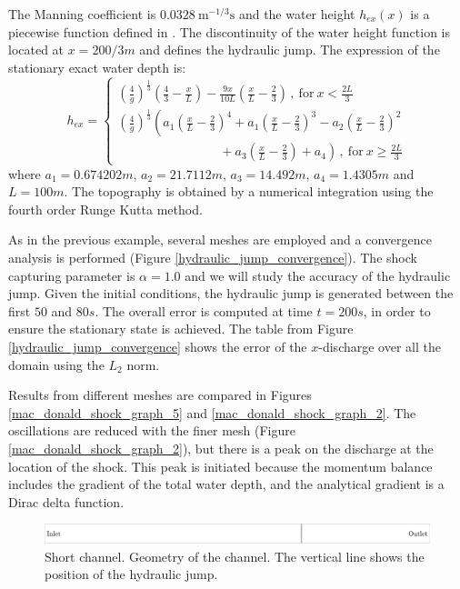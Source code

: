 The Manning coefficient is $0.0328\ \text{m}^{-1/3}\text{s}$ and the water height $h_{ex}(x)$ is a piecewise function defined in \cite{delestre2013}. The discontinuity of the water height function is located at $x=200/3m$ and defines the hydraulic jump. The expression of the stationary exact water depth is:
\begin{equation} \label{jump_height_definition}
    h_{ex} = \begin{cases}
        \left(\frac{4}{g}\right)^\frac{1}{3} \left(\frac{4}{3} - \frac{x}{L}\right) - \frac{9x}{10L}
            \left(\frac{x}{L} - \frac{2}{3}\right) \, ,\ \text{for} \ x < \frac{2L}{3}\\
        \left(\frac{4}{g}\right)^\frac{1}{3} \left(
              a_1 \left(\frac{x}{L} - \frac{2}{3}\right)^4
            + a_1 \left(\frac{x}{L} - \frac{2}{3}\right)^3
            - a_2 \left(\frac{x}{L} - \frac{2}{3}\right)^2 \right. \\ \left. \qquad\qquad\qquad\qquad
            + a_3 \left(\frac{x}{L} - \frac{2}{3}\right)
            + a_4
        \right) \, ,\ \text{for} \ x \geq \frac{2L}{3}
    \end{cases}
\end{equation}
where $a_1=0.674202m$, $a_2=21.7112m$, $a_3=14.492m$, $a_4=1.4305m$ and $L=100m$. The topography is obtained by a numerical integration using the fourth order Runge Kutta method.

As in the previous example, several meshes are employed and a convergence analysis is performed (Figure \ref{hydraulic_jump_convergence}). The shock capturing parameter is $\alpha=1.0$ and we will study the accuracy of the hydraulic jump. 
Given the initial conditions, the hydraulic jump is generated between the first $50$ and $80s$. The overall error is computed at time $t=200s$, in order to ensure the stationary state is achieved.
The table from Figure \ref{hydraulic_jump_convergence} shows the error of the $x$-discharge over all the domain using the $L_2$ norm.

Results from different meshes are compared in Figures \ref{mac_donald_shock_graph_5} and \ref{mac_donald_shock_graph_2}. The oscillations are reduced with the finer mesh (Figure \ref{mac_donald_shock_graph_2}), but there is a peak on the discharge at the location of the shock. This peak is initiated because the momentum balance includes the gradient of the total water depth, and the analytical gradient is a Dirac delta function.

\begin{figure}
    \includegraphics[width=\textwidth]{img/eulerian/jump/sketch.pdf}
    \caption{Short channel. Geometry of the channel. The vertical line shows the position of the hydraulic jump.}
    \label{chanel_geometry}
\end{figure}


